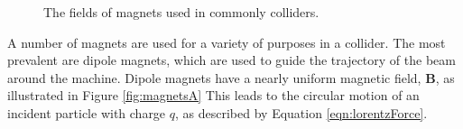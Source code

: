 
\begin{figure}[h!]
\captionsetup[subfigure]{position=b}
\centering
{}
\caption{The fields of magnets used in commonly colliders.}
\label{fig:magnets}
\end{figure}

A number of magnets are used for a variety of purposes in a collider.
The most prevalent are dipole magnets, which are used to guide the trajectory of the beam around the machine.
Dipole magnets have a nearly uniform magnetic field, $\pmb B$, as illustrated in Figure \ref{fig:magnetsA}
This leads to the circular motion of an incident particle with charge $q$, as described by Equation \ref{eqn:lorentzForce}.

